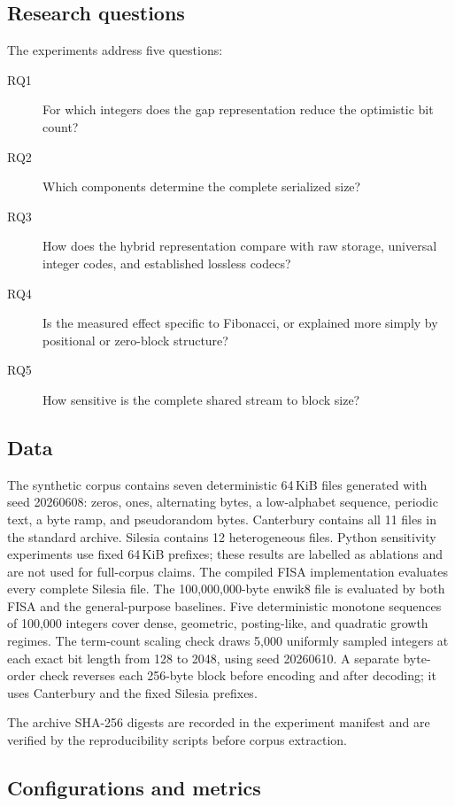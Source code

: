 \documentclass[a4paper,fleqn]{cas-dc}
\begin{document}
\subsection{Research questions}

The experiments address five questions:
\begin{description}
\item[RQ1] For which integers does the gap representation reduce the
optimistic bit count?
\item[RQ2] Which components determine the complete serialized size?
\item[RQ3] How does the hybrid representation compare with raw storage,
universal integer codes, and established lossless codecs?
\item[RQ4] Is the measured effect specific to Fibonacci, or explained more
simply by positional or zero-block structure?
\item[RQ5] How sensitive is the complete shared stream to block size?
\end{description}

\subsection{Data}

The synthetic corpus contains seven deterministic 64\,KiB files generated
with seed 20260608: zeros, ones, alternating bytes, a low-alphabet sequence,
periodic text, a byte ramp, and pseudorandom bytes. Canterbury contains all 11
files in the standard archive. Silesia contains 12 heterogeneous files.
Python sensitivity experiments use fixed 64\,KiB prefixes; these results are
labelled as ablations and are not used for full-corpus claims. The compiled
FISA implementation evaluates every complete Silesia file.
The 100,000,000-byte enwik8 file is evaluated by both FISA and the
general-purpose baselines. Five deterministic monotone sequences
of 100,000 integers cover dense, geometric, posting-like, and quadratic
growth regimes.
The term-count scaling check draws 5,000 uniformly sampled integers at each
exact bit length from 128 to 2048, using seed 20260610. A separate byte-order
check reverses each 256-byte block before encoding and after decoding; it uses
Canterbury and the fixed Silesia prefixes.

The archive SHA-256 digests are recorded in the experiment manifest and are
verified by the reproducibility scripts before corpus extraction.

\subsection{Configurations and metrics}
\end{document}

